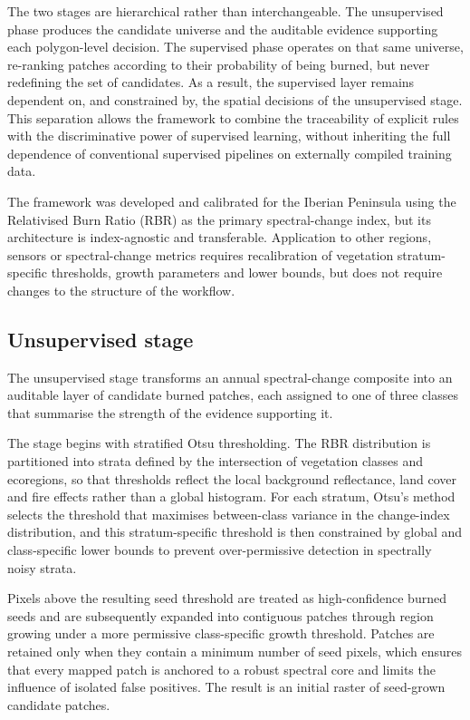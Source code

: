 \documentclass[
  british,
  a4paper,
]{scrbook}
\begin{document}
The two stages are hierarchical rather than interchangeable. The
unsupervised phase produces the candidate universe and the auditable
evidence supporting each polygon-level decision. The supervised phase
operates on that same universe, re-ranking patches according to their
probability of being burned, but never redefining the set of candidates.
As a result, the supervised layer remains dependent on, and constrained
by, the spatial decisions of the unsupervised stage. This separation
allows the framework to combine the traceability of explicit rules with
the discriminative power of supervised learning, without inheriting the
full dependence of conventional supervised pipelines on externally
compiled training data.

The framework was developed and calibrated for the Iberian Peninsula
using the Relativised Burn Ratio (RBR) as the primary spectral-change
index, but its architecture is index-agnostic and transferable.
Application to other regions, sensors or spectral-change metrics
requires recalibration of vegetation stratum-specific thresholds, growth
parameters and lower bounds, but does not require changes to the
structure of the workflow.

\subsection{Unsupervised stage}\label{unsupervised-stage}

The unsupervised stage transforms an annual spectral-change composite
into an auditable layer of candidate burned patches, each assigned to
one of three classes that summarise the strength of the evidence
supporting it.

The stage begins with stratified Otsu thresholding. The RBR distribution
is partitioned into strata defined by the intersection of vegetation
classes and ecoregions, so that thresholds reflect the local background
reflectance, land cover and fire effects rather than a global histogram.
For each stratum, Otsu's method selects the threshold that maximises
between-class variance in the change-index distribution, and this
stratum-specific threshold is then constrained by global and
class-specific lower bounds to prevent over-permissive detection in
spectrally noisy strata.

Pixels above the resulting seed threshold are treated as high-confidence
burned seeds and are subsequently expanded into contiguous patches
through region growing under a more permissive class-specific growth
threshold. Patches are retained only when they contain a minimum number
of seed pixels, which ensures that every mapped patch is anchored to a
robust spectral core and limits the influence of isolated false
positives. The result is an initial raster of seed-grown candidate
patches.
\end{document}
